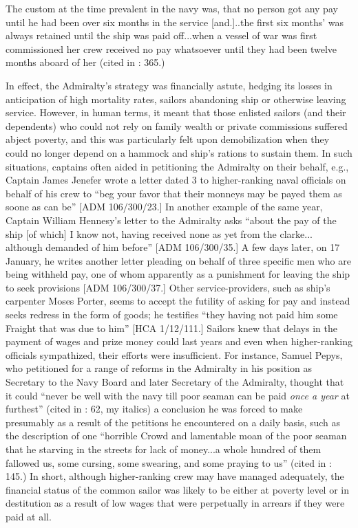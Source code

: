 The custom at the time prevalent in the navy was, that no person got any pay until he had been over six months in the service [and.]..the first six months’ was always retained until the ship was paid off...when a vessel of war was first commissioned her crew received no pay whatsoever until they had been twelve months aboard of her (cited in \citealt{AdkinsAdkins2008}: 365.)

In effect, the Admiralty’s strategy was financially astute, hedging its losses in anticipation of high mortality rates, sailors abandoning ship or otherwise leaving service. However, in human terms, it meant that those enlisted sailors (and their dependents) who could not rely on family wealth or private commissions suffered abject poverty, and this was particularly felt upon demobilization when they could no longer depend on a hammock and ship’s rations to sustain them. In such situations, captains often aided in petitioning the Admiralty on their behalf, e.g., Captain James Jenefer wrote a letter dated 3 \citealt{June1674} to higher-ranking naval officials on behalf of his crew to “beg your favor that their monneys may be payed them as soone as can be” [ADM 106/300/23.] In another example of the same year, Captain William Hennesy’s letter to the Admiralty asks “about the pay of the ship [of which] I know not, having received none as yet from the clarke... although demanded of him before” [ADM 106/300/35.] A few days later, on 17 January, he writes another letter pleading on behalf of three specific men who are being withheld pay, one of whom apparently as a punishment for leaving the ship to seek provisions [ADM 106/300/37.] Other service-providers, such as ship’s carpenter Moses Porter, seems to accept the futility of asking for pay and instead seeks redress in the form of goods; he testifies “they having not paid him some Fraight that was due to him” [HCA 1/12/111.] Sailors knew that delays in the payment of wages and prize money could last years and even when higher-ranking officials sympathized, their efforts were insufficient. For instance, Samuel Pepys, who petitioned for a range of reforms in the Admiralty in his position as Secretary to the Navy Board and later Secretary of the Admiralty, thought that it could  “never be well with the navy till poor seaman can be paid \textit{once a year} at furthest” (cited in \citealt{Palmer1986}: 62, my italics) a conclusion he was forced to make presumably as a result of the petitions he encountered on a daily basis, such as the description of one “horrible Crowd and lamentable moan of the poor seaman that he starving in the streets for lack of money...a whole hundred of them fallowed us, some cursing, some swearing, and some praying to us” (cited in \citealt{Lincoln2015}: 145.) In short, although higher-ranking crew may have managed adequately, the financial status of the common sailor was likely to be either at poverty level or in destitution as a result of low wages that were perpetually in arrears if they were paid at all.  

